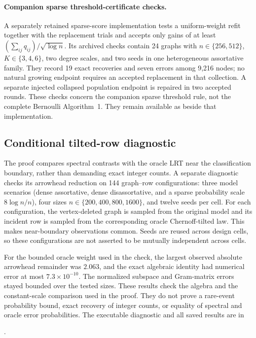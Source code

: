 \documentclass[11pt]{article}
\theoremstyle{definition}
\theoremstyle{remark}
\numberwithin{equation}{section}
\begin{document}
\paragraph{Companion sparse threshold-certificate checks.}
A separately retained sparse-score implementation tests a uniform-weight
refit together with the replacement trials and accepts only gains of at
least $(\sum_{ij}q_{ij})/\sqrt{\log n}$. Its archived checks contain 24
graphs with $n\in\{256,512\}$, $K\in\{3,4,6\}$, two degree scales,
and two seeds in one heterogeneous assortative family. They record 19 exact
recoveries and seven errors among 9,216 nodes; no natural growing endpoint
requires an accepted replacement in that collection. A separate injected
collapsed population endpoint is repaired in two accepted rounds. These
checks concern the companion sparse threshold rule, not the complete
Bernoulli Algorithm~1. They remain available as
 beside that implementation.


\subsection{Conditional tilted-row diagnostic}
\label{sec:tilted-diagnostic}
The proof compares spectral contrasts with the oracle LRT near the classification boundary, rather than demanding exact integer counts. A separate diagnostic checks its arrowhead reduction on 144 graph--row configurations: three model scenarios (dense assortative, dense disassortative, and a sparse probability scale $8\log n/n$), four sizes $n\in\{200,400,800,1600\}$, and twelve seeds per cell. For each configuration, the vertex-deleted graph is sampled from the original model and its incident row is sampled from the corresponding oracle Chernoff-tilted law. This makes near-boundary observations common. Seeds are reused across design cells, so these configurations are not asserted to be mutually independent across cells.

For the bounded oracle weight used in the check, the largest observed absolute arrowhead remainder was $2.063$, and the exact algebraic identity had numerical error at most $7.3\times10^{-10}$. The normalized subspace and Gram-matrix errors stayed bounded over the tested sizes. These results check the algebra and the constant-scale comparison used in the proof. They do not prove a rare-event probability bound, exact recovery of integer counts, or equality of spectral and oracle error probabilities. The executable diagnostic and all saved results are in
\begin{center}
\small{}.
\end{center}
\end{document}
